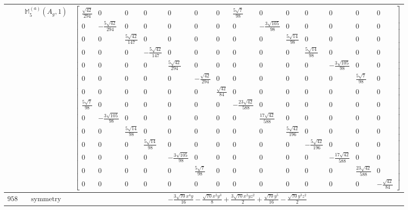 \documentclass[fleqn,8pt,landscape]{jsarticle}
\begin{document}
\begin{longtable}{ccc}
$  $ & $ \mathbb{M}_{5}^{(a)}(A_{g},1) $ & $ \begin{bmatrix} \frac{\sqrt{42}}{294} & 0 & 0 & 0 & 0 & 0 & 0 & \frac{5 \sqrt{7}}{98} & 0 & 0 & 0 & 0 & 0 & 0 \\ 0 & - \frac{5 \sqrt{42}}{294} & 0 & 0 & 0 & 0 & 0 & 0 & - \frac{3 \sqrt{105}}{98} & 0 & 0 & 0 & 0 & 0 \\ 0 & 0 & \frac{5 \sqrt{42}}{147} & 0 & 0 & 0 & 0 & 0 & 0 & \frac{5 \sqrt{14}}{98} & 0 & 0 & 0 & 0 \\ 0 & 0 & 0 & - \frac{5 \sqrt{42}}{147} & 0 & 0 & 0 & 0 & 0 & 0 & \frac{5 \sqrt{14}}{98} & 0 & 0 & 0 \\ 0 & 0 & 0 & 0 & \frac{5 \sqrt{42}}{294} & 0 & 0 & 0 & 0 & 0 & 0 & - \frac{3 \sqrt{105}}{98} & 0 & 0 \\ 0 & 0 & 0 & 0 & 0 & - \frac{\sqrt{42}}{294} & 0 & 0 & 0 & 0 & 0 & 0 & \frac{5 \sqrt{7}}{98} & 0 \\ 0 & 0 & 0 & 0 & 0 & 0 & \frac{\sqrt{42}}{84} & 0 & 0 & 0 & 0 & 0 & 0 & 0 \\ \frac{5 \sqrt{7}}{98} & 0 & 0 & 0 & 0 & 0 & 0 & - \frac{23 \sqrt{42}}{588} & 0 & 0 & 0 & 0 & 0 & 0 \\ 0 & - \frac{3 \sqrt{105}}{98} & 0 & 0 & 0 & 0 & 0 & 0 & \frac{17 \sqrt{42}}{588} & 0 & 0 & 0 & 0 & 0 \\ 0 & 0 & \frac{5 \sqrt{14}}{98} & 0 & 0 & 0 & 0 & 0 & 0 & \frac{5 \sqrt{42}}{196} & 0 & 0 & 0 & 0 \\ 0 & 0 & 0 & \frac{5 \sqrt{14}}{98} & 0 & 0 & 0 & 0 & 0 & 0 & - \frac{5 \sqrt{42}}{196} & 0 & 0 & 0 \\ 0 & 0 & 0 & 0 & - \frac{3 \sqrt{105}}{98} & 0 & 0 & 0 & 0 & 0 & 0 & - \frac{17 \sqrt{42}}{588} & 0 & 0 \\ 0 & 0 & 0 & 0 & 0 & \frac{5 \sqrt{7}}{98} & 0 & 0 & 0 & 0 & 0 & 0 & \frac{23 \sqrt{42}}{588} & 0 \\ 0 & 0 & 0 & 0 & 0 & 0 & 0 & 0 & 0 & 0 & 0 & 0 & 0 & - \frac{\sqrt{42}}{84} \end{bmatrix} $ \\ \hline
$ 958 $ & $ \text{symmetry} $ & $ - \frac{3 \sqrt{70} x^{4} y}{16} - \frac{\sqrt{70} x^{2} y^{3}}{8} + \frac{3 \sqrt{70} x^{2} y z^{2}}{2} + \frac{\sqrt{70} y^{5}}{16} - \frac{\sqrt{70} y^{3} z^{2}}{2} $ \\

\end{longtable}
\end{document}
